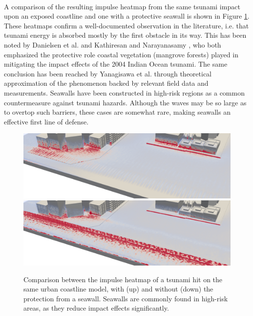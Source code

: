 \documentclass{llncs}
\begin{document}
\paragraph{} A comparison of the resulting impulse heatmap from the same tsunami impact
upon an exposed coastline and one with a protective seawall is shown in Figure
\ref{fig:impulse-heatmaps-seawall}. These heatmaps confirm a well-documented observation
in the literature, i.e. that tsunami energy is absorbed mostly by the first obstacle in
its way. This has been noted by Danielsen et al. \cite{danielsen2005asian} and Kathiresan
and Narayanasamy \cite{kathiresan2005601}, who both emphasized the protective role coastal
vegetation (mangrove forests) played in mitigating the impact effects of the 2004 Indian
Ocean tsunami. The same conclusion has been reached by Yanagisawa et
al. \cite{yanagisawa200927} through theoretical approximation of the phenomenon backed by
relevant field data and measurements. Seawalls have been constructed in high-risk regions
as a common countermeasure against tsunami hazards. Although the waves may be so large as
to overtop such barriers, these cases are somewhat rare, making seawalls an effective
first line of defense.

\begin{figure}
  \includegraphics[width=\textwidth]{figures/if-city0-free.png}
  \includegraphics[width=\textwidth]{figures/if-city0-seawall.png}
  \caption{Comparison between the impulse heatmap of a tsunami hit on the same urban
    coastline model, with (up) and without (down) the protection from a seawall. Seawalls
    are commonly found in high-risk areas, as they reduce impact effects significantly.}
  \label{fig:impulse-heatmaps-seawall}
\end{figure}
\end{document}
